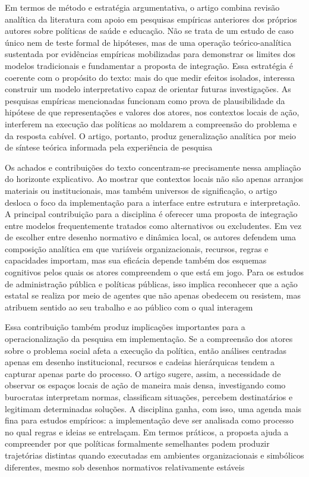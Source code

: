 \documentclass[12pt,a4paper]{article}
\begin{document}
Em termos de método e estratégia argumentativa, o artigo combina revisão analítica da literatura com apoio em pesquisas empíricas anteriores dos próprios autores sobre políticas de saúde e educação. Não se trata de um estudo de caso único nem de teste formal de hipóteses, mas de uma operação teórico-analítica sustentada por evidências empíricas mobilizadas para demonstrar os limites dos modelos tradicionais e fundamentar a proposta de integração. Essa estratégia é coerente com o propósito do texto: mais do que medir efeitos isolados, interessa construir um modelo interpretativo capaz de orientar futuras investigações. As pesquisas empíricas mencionadas funcionam como prova de plausibilidade da hipótese de que representações e valores dos atores, nos contextos locais de ação, interferem na execução das políticas ao moldarem a compreensão do problema e da resposta cabível. O artigo, portanto, produz generalização analítica por meio de síntese teórica informada pela experiência de pesquisa\parencite{ascenzi2013_implementacao_politicas}

Os achados e contribuições do texto concentram-se precisamente nessa ampliação do horizonte explicativo. Ao mostrar que contextos locais não são apenas arranjos materiais ou institucionais, mas também universos de significação, o artigo desloca o foco da implementação para a interface entre estrutura e interpretação. A principal contribuição para a disciplina é oferecer uma proposta de integração entre modelos frequentemente tratados como alternativos ou excludentes. Em vez de escolher entre desenho normativo e dinâmica local, os autores defendem uma composição analítica em que variáveis organizacionais, recursos, regras e capacidades importam, mas sua eficácia depende também dos esquemas cognitivos pelos quais os atores compreendem o que está em jogo. Para os estudos de administração pública e políticas públicas, isso implica reconhecer que a ação estatal se realiza por meio de agentes que não apenas obedecem ou resistem, mas atribuem sentido ao seu trabalho e ao público com o qual interagem\parencite{ascenzi2013_implementacao_politicas}

Essa contribuição também produz implicações importantes para a operacionalização da pesquisa em implementação. Se a compreensão dos atores sobre o problema social afeta a execução da política, então análises centradas apenas em desenho institucional, recursos e cadeias hierárquicas tendem a capturar apenas parte do processo. O artigo sugere, assim, a necessidade de observar os espaços locais de ação de maneira mais densa, investigando como burocratas interpretam normas, classificam situações, percebem destinatários e legitimam determinadas soluções. A disciplina ganha, com isso, uma agenda mais fina para estudos empíricos: a implementação deve ser analisada como processo no qual regras e ideias se entrelaçam. Em termos práticos, a proposta ajuda a compreender por que políticas formalmente semelhantes podem produzir trajetórias distintas quando executadas em ambientes organizacionais e simbólicos diferentes, mesmo sob desenhos normativos relativamente estáveis\parencite{ascenzi2013_implementacao_politicas}
\end{document}

